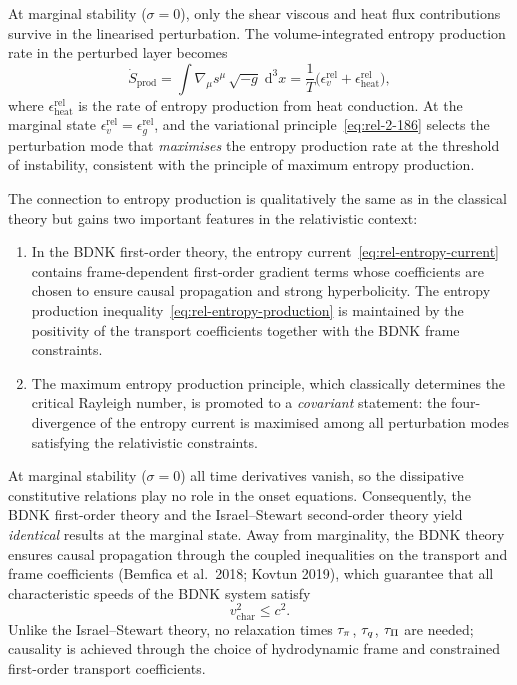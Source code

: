 At marginal stability ($\sigma = 0$), only the shear viscous and heat
flux contributions survive in the linearised perturbation.  The
volume-integrated entropy production rate in the perturbed layer
becomes
\begin{equation}
\label{eq:rel-entropy-rate}
\dot{S}_{\mathrm{prod}}
= \int \nabla_\mu s^\mu\,\sqrt{-g}\;\mathrm{d}^3 x
= \frac{1}{T}\bigl(\epsilon_v^{\mathrm{rel}}
  + \epsilon_{\mathrm{heat}}^{\mathrm{rel}}\bigr),
\end{equation}
where $\epsilon_{\mathrm{heat}}^{\mathrm{rel}}$ is the rate of entropy
production from heat conduction.  At the marginal state
$\epsilon_v^{\mathrm{rel}} = \epsilon_g^{\mathrm{rel}}$, and the
variational principle~\eqref{eq:rel-2-186} selects the perturbation
mode that \emph{maximises} the entropy production rate at the
threshold of instability, consistent with the principle of maximum
entropy production.

\begin{relcorrection}
The connection to entropy production is qualitatively the same as in
the classical theory but gains two important features in the
relativistic context:

\begin{enumerate}
\item In the BDNK first-order theory, the entropy current~\eqref{eq:rel-entropy-current}
  contains frame-dependent first-order gradient terms whose coefficients
  are chosen to ensure causal propagation and strong hyperbolicity.
  The entropy production inequality~\eqref{eq:rel-entropy-production}
  is maintained by the positivity of the transport coefficients
  together with the BDNK frame constraints.

\item The maximum entropy production principle, which classically
  determines the critical Rayleigh number, is promoted to a
  \emph{covariant} statement: the four-divergence of the entropy
  current is maximised among all perturbation modes satisfying the
  relativistic constraints.
\end{enumerate}
\end{relcorrection}

\begin{causalitycheck}
At marginal stability ($\sigma = 0$) all time derivatives vanish,
so the dissipative constitutive relations play no role in the onset
equations.  Consequently, the BDNK first-order theory and the
Israel--Stewart second-order theory yield \emph{identical} results
at the marginal state.  Away from marginality, the BDNK theory
ensures causal propagation through the coupled inequalities on the
transport and frame coefficients (Bemfica et al.\ 2018; Kovtun 2019),
which guarantee that all characteristic speeds of the BDNK system
satisfy
\begin{equation}
v_{\mathrm{char}}^2 \leqslant c^2.
\end{equation}
Unlike the Israel--Stewart theory, no relaxation times $\tau_{\pi}$,
$\tau_{q}$, $\tau_{\Pi}$ are needed; causality is achieved through the
choice of hydrodynamic frame and constrained first-order transport
coefficients.
\end{causalitycheck}


